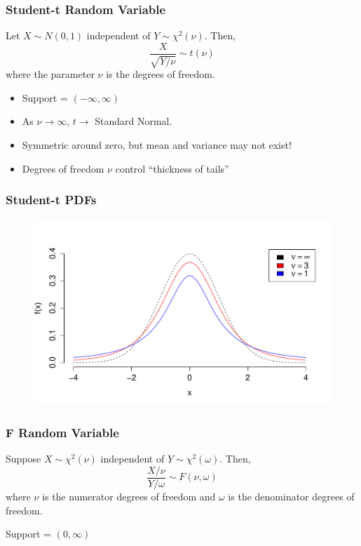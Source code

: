 \documentclass[handout]{beamer}
\begin{document}

\begin{frame}
\frametitle{Student-t Random Variable}
Let $X \sim N(0,1)$ independent of $Y \sim \chi^2(\nu)$. Then,
$$\frac{X}{\sqrt{Y/\nu}}\sim t(\nu)$$
where the parameter $\nu$ is the degrees of freedom.

\pause

\begin{itemize}
	\item Support = $(-\infty, \infty)$
	\item As $\nu \rightarrow \infty$, $t \rightarrow$ Standard Normal.
	\item Symmetric around zero, but mean and variance may not exist!
	\item Degrees of freedom $\nu$ control ``thickness of tails''
\end{itemize}
\vspace{1em}


\end{frame}

\begin{frame}
\frametitle{Student-t PDFs}

\begin{figure}
\includegraphics[scale = 0.58]{./images/tpdf}
\end{figure}
\end{frame}

\begin{frame}
\frametitle{F Random Variable}
Suppose $X \sim \chi^2(\nu)$ independent of $Y \sim \chi^2(\omega)$. Then,
	$$\frac{X/\nu}{Y/\omega} \sim F(\nu, \omega)$$
where $\nu$ is the numerator degrees of freedom and $\omega$ is the denominator degrees of freedom.
\vspace{1em}


\alert{Support = $(0, \infty)$}\\

\end{frame}
\end{document}
